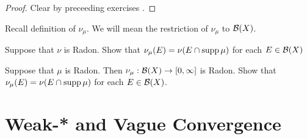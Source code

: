 \documentclass{book}
\begin{document}
	\begin{proof}
		Clear by preceeding exercises .
	\end{proof}
	
	
	\begin{note} 
		Recall definition of $\nu_\mu$. We will mean the restriction of $\nu_{\mu}$ to $\mathcal{B}(X)$.
	\end{note}
	
	\begin{ex}
		Suppose that $\nu$ is Radon. Show that $\nu_{\mu}(E) = \nu(E \cap \operatorname{supp} \mu)$ for each $E \in \mathcal{B}(X)$
	\end{ex}
	
	
	\begin{ex}
		Suppose that $\mu$ is Radon. Then $\nu_{\mu}: \mathcal{B}(X) \rightarrow [0,\infty]$ is Radon. Show that $\nu_{\mu}(E) = \nu(E \cap \operatorname{supp} \mu)$ for each $E \in \mathcal{B}(X)$. 
	\end{ex}
	
	
	
	
	
	
	
	
	
	
	
	
	
	
	
	
	
	
	
	
	
	
	
	
	
	
	
	
	
	
	
	
	
	
	
	
	
	
	
	
	
	
	
	
	
	
	
	
	
	
	
	
	
	
	
	
	
	
	
	
	
	
	
	
	
	
	
	\section{Weak-* and Vague Convergence}
	
\end{document}
